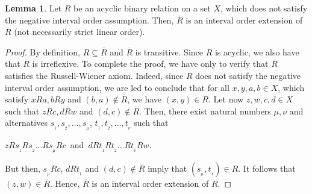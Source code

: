 \documentclass{article}
\theoremstyle{definition}
\newtheorem{lemma}[theorem]{Lemma}
\begin{document}
\begin{lemma}\label{43} {\rm Let $R$ be an acyclic binary relation on a set $X$, which does not satisfy the 
negative interval order assumption. Then, $\overline{R}$ is an
interval
order extension of $R$ (not necessarily strict linear order).}
\end{lemma}
\begin{proof} By definition, $R\subseteq \overline{R}$ and
$\overline{R}$ is transitive. 
Since $R$ is acyclic, we also have that
$\overline{R}$ is irreflexive. 
To complete the proof, we have only to verify that
$\overline{R}$
satisfies the Russell-Wiener axiom. Indeed, since
$R$ does not satisfy the 
negative interval order assumption, we are led to conclude that
for all $x, y, a, b\in X$, which satisfy
$xRa, bRy$ and $(b,a)\notin \overline{R}$, we have $(x,y)\in R$.
Let now
$z, w, c, d\in X$ such that 
$z\overline{R}c, d\overline{R}w$ and $(d,c)\notin \overline{R}$.
Then, there exist natural numbers $\mu, \nu$ and alternatives $s_{_1}, s_{_2},...,s_{_{\mu}}$,
$t_{_1}, t_{_2},...,t_{_{\nu}}$
such that 
\begin{center}
$zRs_{_1}Rs_{_2}...Rs_{_{\mu}}Rc$\ {\rm and}\ 
$dRt_{_1}Rt_{_2}...Rt_{_{\nu}}Rw$.
\end{center}
But then, $s_{_{\mu}}Rc$, $dRt_{_1}$ and $(d,c)\notin \overline{R}$ imply that 
$(s_{_{\mu}},t_{_{1}})\in R$. It follows that $(z,w)\in\overline{R}$. Hence,
$\overline{R}$ is an interval order extension of $R$.
\end{proof}
\end{document}
